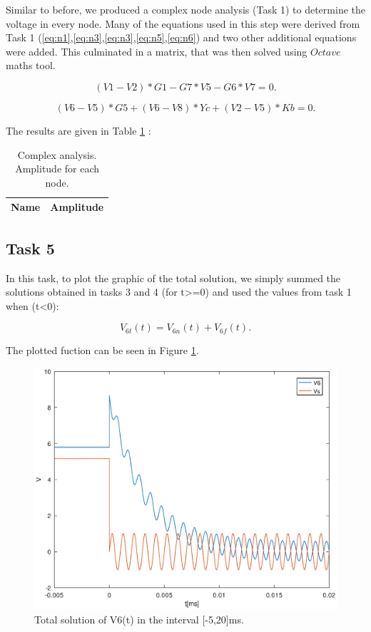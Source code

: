 \par Similar to before, we produced a complex node analysis (Task 1) to determine the voltage in every node. Many of the equations used in this step were derived from Task 1 (\ref{eq:n1},\ref{eq:n3},\ref{eq:n3},\ref{eq:n5},\ref{eq:n6}) and two other additional equations were added. This culminated in a matrix, that was then solved using $Octave$ maths tool.

\begin{equation}
 (V1 - V2)*G1 - G7*V5 - G6*V7 = 0.
\end{equation}

\begin{equation}
 (V6 - V5)*G5 + (V6 - V8)*Yc + (V2 - V5)*Kb = 0.
\end{equation}

\par The results are given in Table \ref{tab:t4} :

 \begin{table}[h]
  \centering
  \begin{tabular}{|l|r|}
    \hline    
    {\bf Name} & {\bf Amplitude} \\ \hline
    
  \end{tabular}
  \caption{Complex analysis. Amplitude for each node.}
  \label{tab:t4}
\end{table}

\newpage

\subsection{Task 5}
In this task, to plot the graphic of the total solution, we simply summed the solutions obtained in tasks 3 and 4 (for t>=0) and used the values from task 1 when (t<0):

\begin{equation}
 V_{6t}(t) = V_{6n}(t) + V_{6f}(t).
\end{equation}

\par The plotted fuction can be seen in Figure \ref{fig:g5}.

\begin{figure}[h] \centering
\includegraphics[width=0.8\linewidth]{tsol.eps}
\caption{Total solution of V6(t) in the interval [-5,20]ms.}
\label{fig:g5}
\end{figure}

